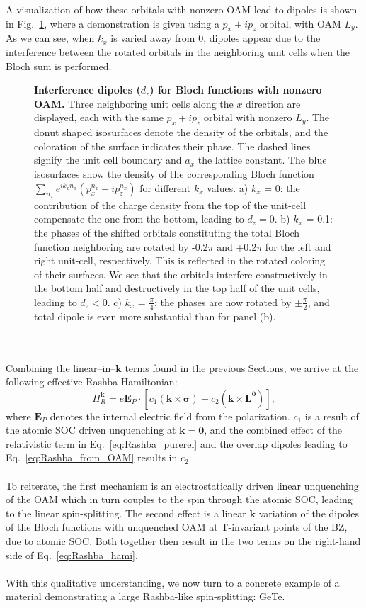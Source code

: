 A visualization of how these orbitals with nonzero OAM lead to dipoles is shown in Fig.~\ref{fig:Rashba_interference}, where a demonstration is given using a $p_x + i p_z$ orbital, with OAM $L_y$.
As we can see, when $k_x$ is varied away from 0, dipoles appear due to the interference between the rotated orbitals in the neighboring unit cells when the Bloch sum is performed.
\begin{figure}
	\centering
{}
\caption{\label{fig:Rashba_interference}{\bf Interference dipoles ($d_z$) for Bloch functions with nonzero OAM.} Three neighboring unit cells along the $x$ direction are displayed, each with the same $p_x + ip_z$ orbital with nonzero $L_y$. The donut shaped isosurfaces denote the density of the orbitals, and the coloration of the surface indicates their phase. The dashed lines signify the unit cell boundary and $a_x$ the lattice constant. The blue isosurfaces show the density of the corresponding Bloch function $\sum_{n_x} e^{i k_x n_x} (p_x^{n_x} + ip_z^{n_x})$ for different $k_x$ values.
a) $k_x$ = 0: the contribution of the charge density from the top of the unit-cell compensate the one from the bottom, leading to $d_z=0$.
b) $k_x$ = 0.1: the phases of the shifted orbitals constituting the total Bloch function neighboring are rotated by -0.2$\pi$ and +0.2$\pi$ for the left and right unit-cell, respectively. This is reflected in the rotated coloring of their surfaces. We see that the orbitals interfere constructively in the bottom half and destructively in the top half of the unit cells, leading to $d_z<0$.
c) $k_x$ = $\frac{\pi}{4}$: the phases are now rotated by $\pm \frac{\pi}{2}$, and total dipole is even more substantial than for panel (b).}
\end{figure}
\\\\
Combining the linear--in--$\bm k$ terms found in the previous Sections, we arrive at the following effective Rashba Hamiltonian:
\begin{equation}
	\label{eq:Rashba_hami}
	H_R^{\bm k} = e \bm{E}_P\cdot \left[c_1(\bm k \times \bm \sigma) + c_2 (\bm k \times \bm{L}^{\bm 0} ) \right],
\end{equation}
where $\bm{E}_P$ denotes the internal electric field from the polarization.
$c_1$ is a result of the atomic SOC driven unquenching at $\bm k = \bm 0$, and the combined effect of the relativistic term in Eq.~\eqref{eq:Rashba_purerel} and the overlap dipoles leading to Eq.~\eqref{eq:Rashba_from_OAM} results in $c_2$.
\\\\
To reiterate, the first mechanism is an electrostatically driven linear unquenching of the OAM which in turn couples to the spin through the atomic SOC, leading to the linear spin-splitting.
The second effect is a linear $\bm k$ variation of the dipoles of the Bloch functions with unquenched OAM at T-invariant points of the BZ, due to atomic SOC. Both together then result in the two terms on the right-hand side of Eq.~\eqref{eq:Rashba_hami}. 
\\\\
With this qualitative understanding, we now turn to a concrete example of a material demonstrating a large Rashba-like spin-splitting: GeTe.

